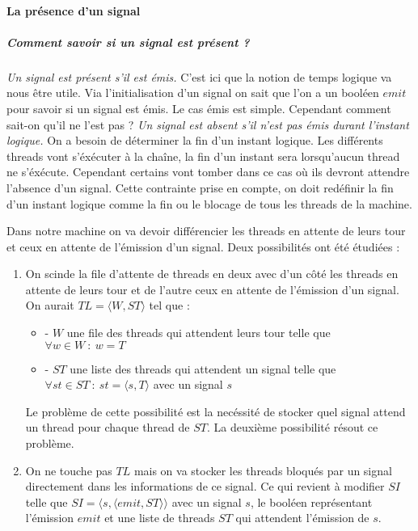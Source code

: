 \documentclass[10pt,a4paper]{report}
\begin{document}
	
	\paragraph{La présence d'un signal}
	
	\subparagraph{Comment savoir si un signal est présent ?}
	\textit{Un signal est présent s'il est émis.}
	\smallbreak
	C'est ici que la notion de temps logique va nous être utile. Via l'initialisation d'un signal on sait que l'on a un booléen $emit$ pour savoir si un signal est émis. Le cas émis est simple. Cependant comment sait-on qu'il ne l'est pas ?
	\smallbreak
	\textit{Un signal est absent s'il n'est pas émis durant l'instant logique.}
	\smallbreak
	On a besoin de déterminer la fin d'un instant logique. Les différents threads vont s'éxécuter à la chaîne, la fin d'un instant sera lorsqu'aucun thread ne s'éxécute. Cependant certains vont tomber dans ce cas où ils devront attendre l'absence d'un signal. Cette contrainte prise en compte, on doit redéfinir la fin d'un instant logique comme la fin ou le blocage de tous les threads de la machine.
	\medbreak
	
	Dans notre machine on va devoir différencier les threads en attente de leurs tour et ceux en attente de l'émission d'un signal. Deux possibilités ont été étudiées :
	\begin{enumerate}
		\item On scinde la file d'attente de threads en deux avec d'un côté les threads en attente de leurs tour et de l'autre ceux en attente de l'émission d'un signal. On aurait $TL =\langle W,ST\rangle$ tel que :
		\begin{itemize}
			\item[] - $W$ une file des threads qui attendent leurs tour telle que $\forall w \in W~:~w = T$ 
			\item[] - $ST$ une liste des threads qui attendent un signal telle que $\forall st \in ST~:~st = \langle s,T\rangle$ avec un signal $s$ 
		\end{itemize}
		\medbreak
		
		Le problème de cette possibilité est la necéssité de stocker quel signal attend un thread pour chaque thread de $ST$. La deuxième possibilité résout ce problème.
		\item On ne touche pas $TL$ mais on va stocker les threads bloqués par un signal directement dans les informations de ce signal. Ce qui revient à modifier $SI$ telle que $SI = \langle s , \langle emit , ST \rangle\rangle$ avec un signal $s$, le booléen représentant l'émission $emit$ et une liste de threads $ST$ qui attendent l'émission de $s$.
	\end{enumerate}
	\medbreak
	
\end{document}
